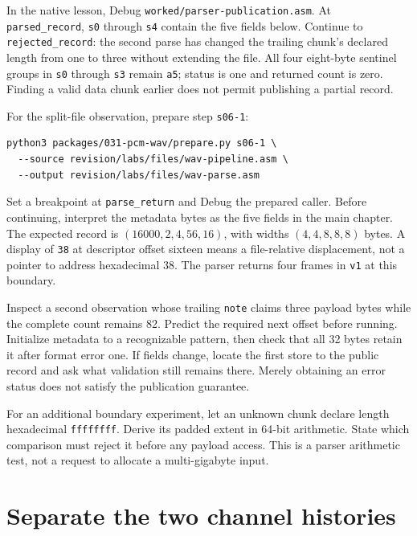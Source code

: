 In the native lesson, Debug \texttt{worked/parser-publication.asm}. At
\texttt{parsed\_record}, \texttt{s0} through \texttt{s4} contain the five
fields below. Continue to \texttt{rejected\_record}: the second parse has changed
the trailing chunk's declared length from one to three without extending the
file. All four eight-byte sentinel groups in \texttt{s0} through \texttt{s3}
remain \texttt{a5}; status is one and returned count is zero. Finding a valid
data chunk earlier does not permit publishing a partial record.

For the split-file observation, prepare step \texttt{s06-1}:
\begin{Verbatim}
python3 packages/031-pcm-wav/prepare.py s06-1 \
  --source revision/labs/files/wav-pipeline.asm \
  --output revision/labs/files/wav-parse.asm
\end{Verbatim}
Set a breakpoint at \texttt{parse\_return} and Debug the prepared caller.
Before continuing, interpret the metadata bytes as the five fields in the
main chapter. The expected record is $(16000,2,4,56,16)$, with widths
$(4,4,8,8,8)$ bytes. A display of \texttt{38} at descriptor offset sixteen
means a file-relative displacement, not a pointer to address hexadecimal 38.
The parser returns four frames in \texttt{v1} at this boundary.

Inspect a second observation whose trailing \texttt{note} claims three payload
bytes while the complete count remains 82. Predict the required next offset
before running. Initialize metadata to a recognizable pattern, then check that
all 32 bytes retain it after format error one. If fields change, locate the
first store to the public record and ask what validation still remains there.
Merely obtaining an error status does not satisfy the publication guarantee.

For an additional boundary experiment, let an unknown chunk declare length
hexadecimal \texttt{ffffffff}. Derive its padded extent in 64-bit arithmetic.
State which comparison must reject it before any payload access. This is a
parser arithmetic test, not a request to allocate a multi-gigabyte input.

\section{Separate the two channel histories}

